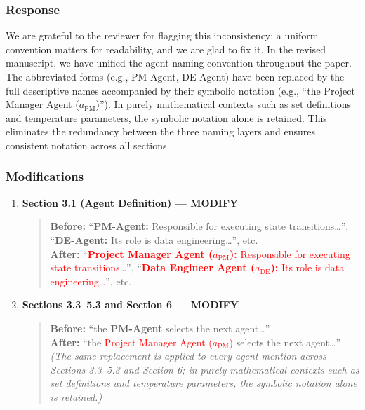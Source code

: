 \documentclass[11pt,a4paper]{article}
\begin{document}
\subsubsection{Response}
We are grateful to the reviewer for flagging this inconsistency; a uniform convention matters for readability, and we are glad to fix it. In the revised manuscript, we have unified the agent naming convention throughout the paper. The abbreviated forms (e.g., PM-Agent, DE-Agent) have been replaced by the full descriptive names accompanied by their symbolic notation (e.g., ``the Project Manager Agent ($a_{\text{PM}}$)''). In purely mathematical contexts such as set definitions and temperature parameters, the symbolic notation alone is retained. This eliminates the redundancy between the three naming layers and ensures consistent notation across all sections.

\subsubsection{Modifications}
\begin{enumerate}
\item \textbf{Section 3.1 (Agent Definition) --- MODIFY}
\begin{quote}
\textbf{Before:} ``\textbf{PM-Agent:} Responsible for executing state transitions\ldots'', ``\textbf{DE-Agent:} Its role is data engineering\ldots'', etc.\\[4pt]
\textbf{After:} ``\textcolor{red}{\textbf{Project Manager Agent ($a_{\text{PM}}$):} Responsible for executing state transitions\ldots}'', ``\textcolor{red}{\textbf{Data Engineer Agent ($a_{\text{DE}}$):} Its role is data engineering\ldots}'', etc.
\end{quote}
\item \textbf{Sections 3.3--5.3 and Section 6 --- MODIFY}
\begin{quote}
\textbf{Before:} ``the \textbf{PM-Agent} selects the next agent\ldots''\\[4pt]
\textbf{After:} ``the \textcolor{red}{Project Manager Agent ($a_{\text{PM}}$)} selects the next agent\ldots''\\[4pt]
\textit{(The same replacement is applied to every agent mention across Sections 3.3--5.3 and Section 6; in purely mathematical contexts such as set definitions and temperature parameters, the symbolic notation alone is retained.)}
\end{quote}
\end{enumerate}
\end{document}
